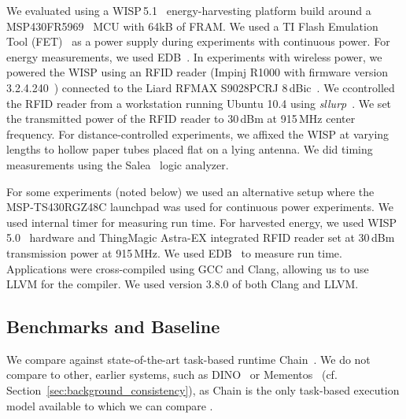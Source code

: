 
We evaluated \sys using a WISP\,5.1~\cite{wisp5,wisp} energy-harvesting
platform build around a MSP430FR5969~\cite{wolverine} MCU with 64kB of FRAM.
We used a TI Flash Emulation Tool (FET)~\cite{fet} as a power supply during
experiments with continuous power.  For energy measurements, we used
EDB~\cite{edb}.  In experiments with wireless power, we powered the WISP using
an RFID reader (Impinj R1000 with firmware version
3.2.4.240~\cite{r1000_data_sheet}) connected to the Liard RFMAX S9028PCRJ
8\,dBic~\cite{atlas2015}. We ccontrolled the RFID reader from a workstation
running Ubuntu 10.4 using \emph{sllurp}~\cite{sllrp_github}.  We set the
transmitted power of the RFID reader to 30\,dBm at 915\,MHz center frequency.
For distance-controlled experiments, we affixed the WISP at varying lengths to
hollow paper tubes placed flat on a lying antenna. We did timing measurements
using the Salea~\cite{saleae} logic analyzer.

For some experiments (noted below) we used an alternative setup where the
MSP-TS430RGZ48C launchpad was used for continuous power experiments. We used
internal timer for measuring run time. For harvested energy, we used
WISP\,5.0~\cite{wisp5,wisp} hardware and ThingMagic Astra-EX integrated RFID
reader set at 30\,dBm transmission power at 915\,MHz.  We used EDB~\cite{edb}
to measure run time. Applications were cross-compiled using GCC and Clang,
allowing us to use LLVM for the \sys compiler. We used version 3.8.0 of both
Clang and LLVM.

\subsection{Benchmarks and Baseline}
\label{sec:results_software}

We compare \sys against state-of-the-art task-based runtime Chain~\cite{chain}.
We do not compare \sys to other, earlier systems, such as DINO~\cite{dino} or
Mementos~\cite{mementos} (cf. Section~\ref{sec:background_consistency}), as
Chain is the only task-based execution model available to which we can compare
\sys. 

